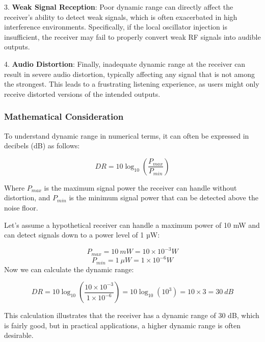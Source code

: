 3. \textbf{Weak Signal Reception}: Poor dynamic range can directly affect the receiver’s ability to detect weak signals, which is often exacerbated in high interference environments. Specifically, if the local oscillator injection is insufficient, the receiver may fail to properly convert weak RF signals into audible outputs.

4. \textbf{Audio Distortion}: Finally, inadequate dynamic range at the receiver can result in severe audio distortion, typically affecting any signal that is not among the strongest. This leads to a frustrating listening experience, as users might only receive distorted versions of the intended outputs.

\subsubsection{Mathematical Consideration}
To understand dynamic range in numerical terms, it can often be expressed in decibels (dB) as follows:

\[
DR = 10 \log_{10} \left( \frac{P_{max}}{P_{min}} \right)
\]

Where \(P_{max}\) is the maximum signal power the receiver can handle without distortion, and \(P_{min}\) is the minimum signal power that can be detected above the noise floor.

Let's assume a hypothetical receiver can handle a maximum power of 10 mW and can detect signals down to a power level of 1 µW:

\[
P_{max} = 10\ mW = 10 \times 10^{-3} W
\]
\[
P_{min} = 1\ \mu W = 1 \times 10^{-6} W
\]
Now we can calculate the dynamic range:

\[
DR = 10 \log_{10} \left( \frac{10 \times 10^{-3}}{1 \times 10^{-6}} \right) = 10 \log_{10} (10^{3}) = 10 \times 3 = 30\ dB
\]

This calculation illustrates that the receiver has a dynamic range of 30 dB, which is fairly good, but in practical applications, a higher dynamic range is often desirable.


    
